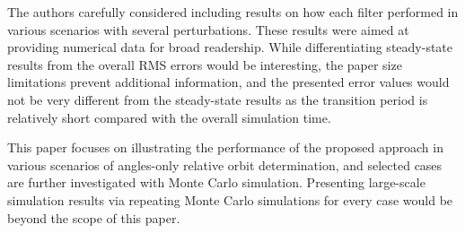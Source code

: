 \documentclass[11pt]{article}
\begin{document}
\begin{itemize}
\begin{enumerate}

The authors carefully considered including results on how each filter performed in various scenarios with several perturbations. These results were aimed at providing numerical data for broad readership. While differentiating steady-state results from the overall RMS errors would be interesting, the paper size limitations prevent additional information, and the presented error values would not be very different from the steady-state results as the transition period is relatively short compared with the overall simulation time. 

This paper focuses on illustrating the performance of the proposed approach in various scenarios of angles-only relative orbit determination, and selected cases are further investigated with Monte Carlo simulation. Presenting large-scale simulation results via repeating Monte Carlo simulations for every case would be beyond the scope of this paper. 


\end{enumerate}

\end{itemize}
%
%
%
%
%
\end{document}
